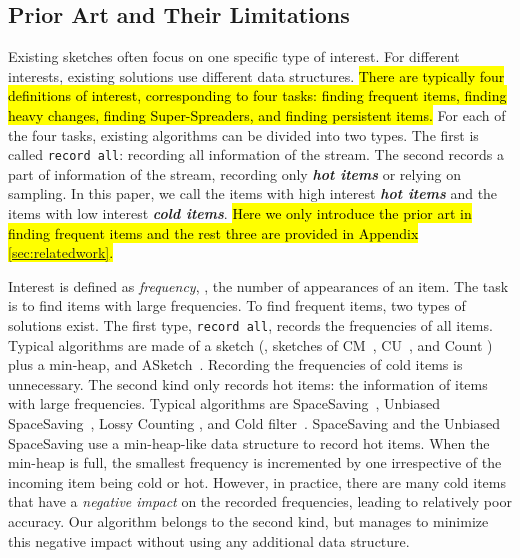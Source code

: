 \vvv
\presub
\subsection{Prior Art and Their Limitations} \postsub
\label{sec:intro:priorart}

Existing sketches often focus on one specific type of interest. 
%
For different interests, existing solutions use different data structures.
%
\hl{There are typically four definitions of interest, corresponding to four tasks: finding frequent items, finding heavy changes, finding Super-Spreaders, and finding persistent items.} For each of the four tasks, existing algorithms can be divided into two types. 
The first is called \texttt{record all}: recording all information of the stream. 
The second records a part of information of the stream, recording only \textbf{\textit{hot items}} or relying on sampling. 
In this paper, we call the items with high interest \textbf{\textit{hot items}} and the items with low interest \textbf{\textit{cold items}}.
\hl{Here we only introduce the prior art in finding frequent items and the rest three are provided in Appendix {\ref{sec:relatedwork}}.}

Interest is defined as \textit{frequency}, \ie, the number of appearances of an item.
%
The task is to find items with large frequencies.
%
To find frequent items, two types of solutions exist. The first type, \texttt{record all}, records the frequencies of all items.
Typical algorithms are made of a sketch (\eg, sketches of CM~\cite{cmsketch}, CU~\cite{cusketch}, and Count \cite{countsketch}) plus a min-heap, and ASketch~\cite{asketch}. Recording the frequencies of cold items is unnecessary. The second kind only records hot items: the information of items with large frequencies. Typical algorithms are SpaceSaving~\cite{spacesaving}, Unbiased SpaceSaving~\cite{unbiasedsketch}, Lossy Counting \cite{losscounting}, and Cold filter~\cite{coldfilter}.
%
SpaceSaving and the Unbiased SpaceSaving use a min-heap-like data structure to record hot items. 
When the min-heap is full, the smallest frequency is incremented by one irrespective of the incoming item being cold or hot. However, in practice, there are many cold items that have a \textit{negative impact} on the recorded frequencies, leading to relatively poor accuracy.
%
Our algorithm belongs to the second kind, but manages to minimize this negative impact without using any additional data structure. 

